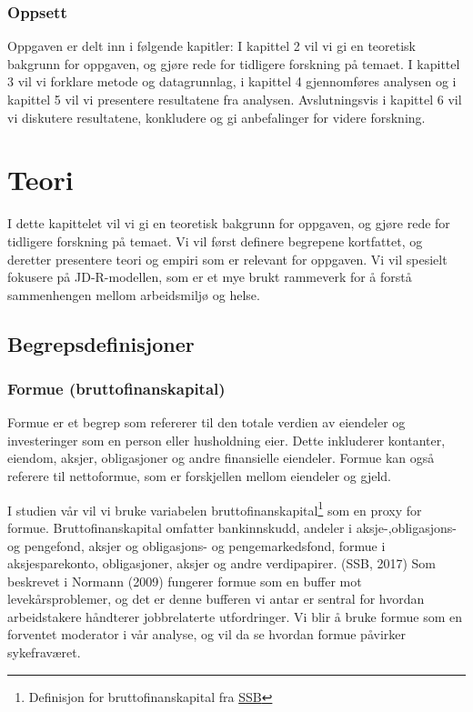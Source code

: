 \documentclass[
  12pt,
  a4paper,
  DIV=11,
  numbers=noendperiod]{scrartcl}
\begin{document}
\subsubsection{Oppsett}\label{oppsett}

Oppgaven er delt inn i følgende kapitler: I kapittel 2 vil vi gi en
teoretisk bakgrunn for oppgaven, og gjøre rede for tidligere forskning
på temaet. I kapittel 3 vil vi forklare metode og datagrunnlag, i
kapittel 4 gjennomføres analysen og i kapittel 5 vil vi presentere
resultatene fra analysen. Avslutningsvis i kapittel 6 vil vi diskutere
resultatene, konkludere og gi anbefalinger for videre forskning.

\newpage

\section{Teori}\label{teori}

I dette kapittelet vil vi gi en teoretisk bakgrunn for oppgaven, og
gjøre rede for tidligere forskning på temaet. Vi vil først definere
begrepene kortfattet, og deretter presentere teori og empiri som er
relevant for oppgaven. Vi vil spesielt fokusere på JD-R-modellen, som er
et mye brukt rammeverk for å forstå sammenhengen mellom arbeidsmiljø og
helse.

\subsection{Begrepsdefinisjoner}\label{begrepsdefinisjoner}

\subsubsection{Formue
(bruttofinanskapital)}\label{formue-bruttofinanskapital}

Formue er et begrep som refererer til den totale verdien av eiendeler og
investeringer som en person eller husholdning eier. Dette inkluderer
kontanter, eiendom, aksjer, obligasjoner og andre finansielle eiendeler.
Formue kan også referere til nettoformue, som er forskjellen mellom
eiendeler og gjeld.

I studien vår vil vi bruke variabelen bruttofinanskapital\footnote{Definisjon
  for bruttofinanskapital fra
  \href{https://www.ssb.no/a/metadata/conceptvariable/vardok/3449/nb}{SSB}}
som en proxy for formue. Bruttofinanskapital omfatter bankinnskudd,
andeler i aksje-,obligasjons- og pengefond, aksjer og obligasjons- og
pengemarkedsfond, formue i aksjesparekonto, obligasjoner, aksjer og
andre verdipapirer. (SSB, 2017) Som beskrevet i Normann (2009) fungerer
formue som en buffer mot levekårsproblemer, og det er denne bufferen vi
antar er sentral for hvordan arbeidstakere håndterer jobbrelaterte
utfordringer. Vi blir å bruke formue som en forventet moderator i vår
analyse, og vil da se hvordan formue påvirker sykefraværet.
\end{document}
